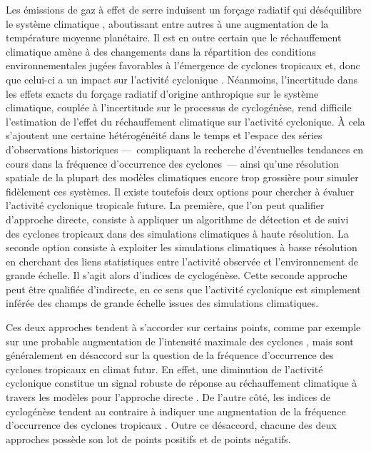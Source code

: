 \documentclass[../main.tex]{subfiles}
\begin{document}
Les émissions de gaz à effet de serre induisent un forçage radiatif qui déséquilibre le système climatique \parencite{charney_carbon_1979}, aboutissant entre
autres à une augmentation de la température moyenne planétaire. Il est en outre certain que le réchauffement climatique amène à des changements dans la
répartition des conditions environnementales jugées favorables à l'émergence de cyclones tropicaux et, donc que celui-ci a un impact sur l'activité cyclonique
\parencite{seneviratne_weather_2021}. Néanmoins, l'incertitude dans les effets exacts du forçage radiatif d'origine anthropique sur le système climatique,
couplée à l'incertitude sur le processus de cyclogénèse, rend difficile l'estimation de l'effet du réchauffement climatique sur l'activité cyclonique. À cela
s'ajoutent une certaine hétérogénéité dans le temps et l'espace des séries d'observations historiques ---~compliquant la recherche d'éventuelles tendances en
cours dans la fréquence d'occurrence des cyclones~--- ainsi qu'une résolution spatiale de la plupart des modèles climatiques encore trop grossière pour simuler fidèlement ces
systèmes. Il existe toutefois deux options pour chercher à évaluer l'activité cyclonique tropicale future. La première, que l'on peut qualifier d'approche
directe, consiste à appliquer un algorithme de détection et de suivi des cyclones tropicaux dans des simulations climatiques à haute résolution. La seconde
option consiste à exploiter les simulations climatiques à basse résolution en cherchant des liens statistiques entre l'activité observée et l'environnement de
grande échelle. Il s'agit alors d'indices de cyclogénèse. Cette seconde approche peut être qualifiée d'indirecte, en ce sens que l'activité cyclonique est
simplement inférée des champs de grande échelle issues des simulations climatiques.

Ces deux approches tendent à s'accorder sur certains points, comme par exemple sur une probable augmentation de l'intensité maximale des cyclones
\parencite{sobel_human_2016,bhatia_projected_2018}, mais sont généralement en désaccord sur la question de la fréquence d'occurrence des cyclones tropicaux en
climat futur. En effet, une diminution de l'activité cyclonique constitue un signal robuste de réponse au réchauffement climatique à travers les modèles pour
l'approche directe \parencite{christensen_climate_2013,knutson_tropical_2020}. De l'autre côté, les indices de cyclogénèse tendent au contraire à indiquer une
augmentation de la fréquence d'occurrence des cyclones tropicaux \parencite{emanuel_downscaling_2013,camargo_testing_2014}. Outre ce désaccord, chacune des deux
approches possède son lot de points positifs et de points négatifs.
\end{document}
